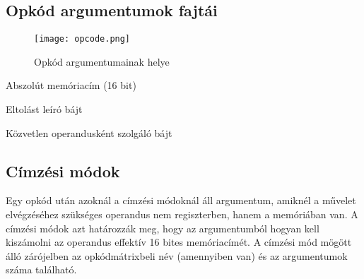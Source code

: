 \subsection{Opkód argumentumok fajtái}

\begin{figure}[H]
	\centering
	\texttt{[image: opcode.png]}
	\caption{Opkód argumentumainak helye}
\end{figure}

\begin{compactitem}
	\item Abszolút memóriacím (16 bit)
	\item Eltolást leíró bájt
	\item Közvetlen operandusként szolgáló bájt
\end{compactitem}

\subsection{Címzési módok}

Egy opkód után azoknál a címzési módoknál áll argumentum, amiknél a művelet elvégzéséhez 
szükséges operandus nem regiszterben, hanem a memóriában van. A címzési módok azt határozzák meg, hogy az argumentumból hogyan kell kiszámolni az operandus effektív 16 bites memóriacímét. A címzési mód mögött álló zárójelben az opkódmátrixbeli név (amennyiben van) és az argumentumok száma található.  


